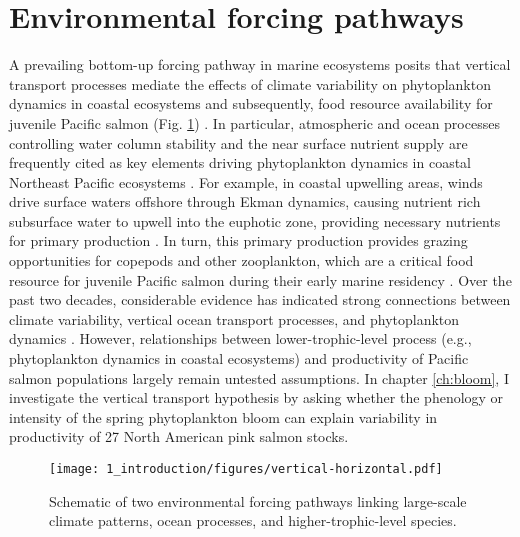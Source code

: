 

\section{Environmental forcing pathways}

A prevailing bottom-up forcing pathway in marine ecosystems posits that vertical
transport processes mediate the effects of climate variability on phytoplankton
dynamics in coastal ecosystems and subsequently, food resource availability for
juvenile Pacific salmon (Fig. \ref{fig:intro:1}) \citep{DiLorenzo2013b,
Rykaczewski2008a, Ware1991a}. In particular, atmospheric and ocean processes
controlling water column stability and the near surface nutrient supply are
frequently cited as key elements driving phytoplankton dynamics in coastal
Northeast Pacific ecosystems \citep{Henson2007a, Gargett1997a}. For example, in
coastal upwelling areas, winds drive surface waters offshore through Ekman
dynamics, causing nutrient rich subsurface water to upwell into the euphotic
zone, providing necessary nutrients for primary production \citep{Huyer1983}. In
turn, this primary production provides grazing opportunities for copepods and
other zooplankton, which are a critical food resource for juvenile Pacific
salmon during their early marine residency \citep{Armstrong2008a,
Beauchamp2007a, Brodeur2007a}. Over the past two decades, considerable evidence
has indicated strong connections between climate variability, vertical ocean
transport processes, and phytoplankton dynamics \citep{Chenillat2012,
Polovina1995a, Henson2007a, Henson2007b, Stabeno2004a, Weingartner2002a}.
However, relationships between lower-trophic-level process (e.g., phytoplankton
dynamics in coastal ecosystems) and productivity of Pacific salmon populations
largely remain untested assumptions. In chapter \ref{ch:bloom}, I investigate
the vertical transport hypothesis by asking whether the phenology or intensity
of the spring phytoplankton bloom can explain variability in productivity of 27
North American pink salmon stocks.

\begin{figure}[htbp]
  \centering
  \texttt{[image: 1\_introduction/figures/vertical-horizontal.pdf]}
  \caption[Schematic of two environmental forcing pathways]{Schematic of two
           environmental forcing pathways linking large-scale climate patterns,
           ocean processes, and higher-trophic-level species.}
  \label{fig:intro:1}
\end{figure}

